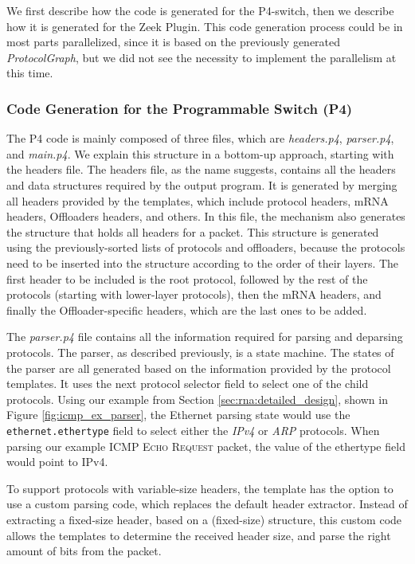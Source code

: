 We first describe how the code is generated for the P4-switch, then we describe how it is generated for the Zeek Plugin. This code generation process could be in most parts parallelized, since it is based on the previously generated \textit{ProtocolGraph}, but we did not see the necessity to implement the parallelism at this time.

\subsubsection*{Code Generation for the Programmable Switch (P4)}

The P4 code is mainly composed of three files, which are \textit{headers.p4}, \textit{parser.p4}, and \textit{main.p4}. We explain this structure in a bottom-up approach, starting with the headers file. The headers file, as the name suggests, contains all the headers and data structures required by the output program. It is generated by merging all headers provided by the templates, which include protocol headers, mRNA headers, Offloaders headers, and others. In this file, the mechanism also generates the structure that holds all headers for a packet. This structure is generated using the previously-sorted lists of protocols and offloaders, because the protocols need to be inserted into the structure according to the order of their layers. The first header to be included is the root protocol, followed by the rest of the protocols (starting with lower-layer protocols), then the mRNA headers, and finally the Offloader-specific headers, which are the last ones to be added.

The \textit{parser.p4} file contains all the information required for parsing and deparsing protocols. The parser, as described previously, is a state machine. The states of the parser are all generated based on the information provided by the protocol templates. It uses the next protocol selector field to select one of the child protocols. Using our example from Section \ref{sec:rna:detailed_design}, shown in Figure \ref{fig:icmp_ex_parser}, the Ethernet parsing state would use the \texttt{ethernet.ethertype} field to select either the \textit{IPv4} or \textit{ARP} protocols. When parsing our example \textsc{ICMP Echo Request} packet, the value of the ethertype field would point to IPv4.

To support protocols with variable-size headers, the template has the option to use a custom parsing code, which replaces the default header extractor. Instead of extracting a fixed-size header, based on a (fixed-size) structure, this custom code allows the templates to determine the received header size, and parse the right amount of bits from the packet.


